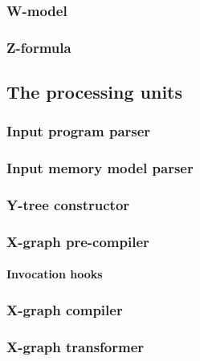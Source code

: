 \subsubsection{W-model}
\label{ch:impl:model:wmodel}

\subsubsection{Z-formula}
\label{ch:impl:model:zformula}


\subsection{The processing units} %
\label{ch:impl:proc}

\subsubsection{Input program parser}
\label{ch:impl:proc:inp-prog-parser}


\subsubsection{Input memory model parser}
\label{ch:impl:proc:inp-mod-parser}

\subsubsection{Y-tree constructor}
\label{ch:impl:proc:y-constr}

\subsubsection{X-graph pre-compiler}
\label{ch:impl:proc:x-pre-compiler}

\paragraph{Invocation hooks}
\label{ch:impl:proc:x-pre-compiler:hooks}

\subsubsection{X-graph compiler}
\label{ch:impl:proc:x-compiler}

\subsubsection{X-graph transformer}
\label{ch:impl:proc:x-transf}

